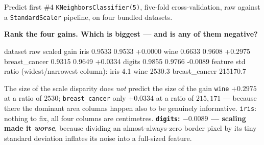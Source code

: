 \documentclass[aspectratio=169]{beamer}
\begin{document}
\begin{frame}[fragile,shrink=8]{Predict first \#4}
\texttt{KNeighborsClassifier(5)}, five-fold cross-validation, raw against a
\texttt{StandardScaler} pipeline, on four bundled datasets.

\begin{center}
  \textbf{Rank the four gains. Which is biggest --- and is any of them
  negative?}
\end{center}
\vspace{0.2em}
\begin{outblk}
dataset                 raw     scaled      gain
iris                 0.9533     0.9533   +0.0000
wine                 0.6633     0.9608   +0.2975
breast_cancer        0.9315     0.9649   +0.0334
digits               0.9855     0.9766   -0.0089
feature std ratio (widest/narrowest column):
  iris                      4.1
  wine                   2530.3
  breast_cancer        215170.7
\end{outblk}
\begin{alertblock}{The size of the scale disparity does \emph{not} predict the
size of the gain}
  \footnotesize \texttt{wine} $+0.2975$ at a ratio of $2530$;
  \texttt{breast\_cancer} only $+0.0334$ at a ratio of $215{,}171$ --- because
  there the dominant area columns happen also to be genuinely informative.
  \texttt{iris}: nothing to fix, all four columns are centimetres.
  \textbf{\texttt{digits}: $-0.0089$ --- scaling made it \emph{worse}},
  because dividing an almost-always-zero border pixel by its tiny standard
  deviation inflates its noise into a full-sized feature.
\end{alertblock}
\end{frame}
\end{document}
